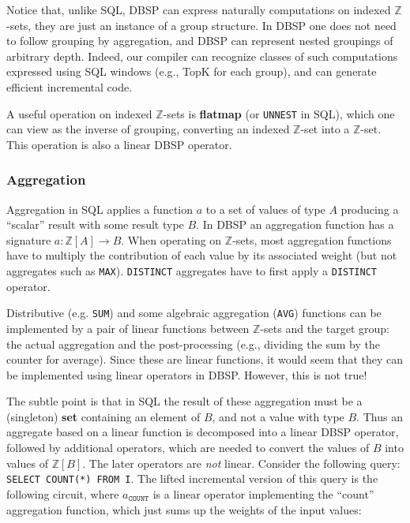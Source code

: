 \documentclass[twocolumn
]{svjour3}
\numberwithin{equation}{section}
\newcommand{\dbsp}{DBSP\xspace}
\newcommand{\defined}[1]{\textbf{#1}\index{}}
\newcommand{\zr}{$\Z$-set\xspace}
\newcommand{\zrs}{$\Z$-sets\xspace} %
\newcommand{\code}[1]{\mbox{\texttt{#1}}}
\newcommand{\Z}{\mathbb{Z}}  %
\begin{document}
Notice that, unlike SQL, \dbsp can express naturally computations on
indexed \zrs, they are just an instance of a group structure.  In
\dbsp one does not need to follow grouping by aggregation, and \dbsp
can represent nested groupings of arbitrary depth.  Indeed, our
compiler can recognize classes of such computations expressed using
SQL windows (e.g., TopK for each group), and can generate efficient
incremental code.



A useful operation on indexed \zrs is \defined{flatmap} (or
\code{UNNEST} in SQL), which one can view as the inverse of grouping,
converting an indexed \zr into a \zr.  This operation is also a linear
\dbsp operator.

\subsubsection{Aggregation}\label{sec:aggregation}

Aggregation in SQL applies a function $a$ to a set of values of type
$A$ producing a ``scalar'' result with some result type $B$.  In \dbsp
an aggregation function has a signature $a: \Z[A] \to B$.  When
operating on \zrs, most aggregation functions have to multiply the
contribution of each value by its associated weight (but not
aggregates such as \code{MAX}).  \texttt{DISTINCT} aggregates have to
first apply a \texttt{DISTINCT} operator.

Distributive (e.g. \code{SUM}) and some algebraic aggregation
(\code{AVG}) functions can be implemented by a pair of linear
functions between \zrs and the target group: the actual aggregation
and the post-processing (e.g., dividing the sum by the counter for
average).  Since these are linear functions, it would seem that they
can be implemented using linear operators in \dbsp.  However, this is
not true!

The subtle point is that in SQL the result of these aggregation must
be a (singleton) \textbf{set} containing an element of $B$, and not a
value with type $B$.  Thus an aggregate based on a linear function is
decomposed into a linear \dbsp operator, followed by additional
operators, which are needed to convert the values of $B$ into values
of $\Z[B]$.  The later operators are \emph{not} linear.  Consider the
following query: \code{SELECT COUNT(*) FROM I}.  The lifted
incremental version of this query is the following circuit, where
$a_\texttt{COUNT}$ is a linear operator implementing the ``count''
aggregation function, which just sums up the weights of the input
values:
\end{document}
